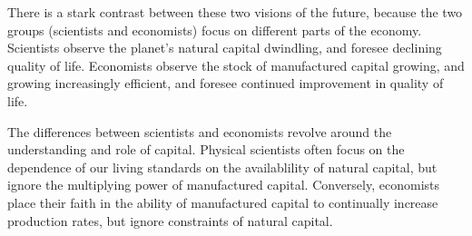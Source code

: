 There is a stark contrast between these two visions of the future, 
because the two groups (scientists and economists) focus on 
different parts of the economy.
Scientists observe the planet's natural capital dwindling, 
and foresee declining quality of life.
Economists observe the stock of manufactured capital growing, 
and growing increasingly efficient, 
and foresee continued improvement in quality of life. 

The differences between scientists and economists revolve around 
the understanding and role of capital.
Physical scientists often focus on the dependence of our
living standards on the availablility of natural capital, but ignore the 
multiplying power of manufactured capital. Conversely,
economists place their faith in the ability of manufactured capital 
to continually increase production rates, 
but ignore constraints of natural capital.


\vspace{10 mm}

